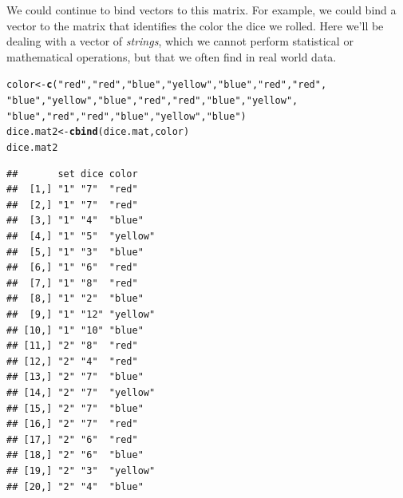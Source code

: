 \documentclass[12pt]{article}\usepackage[]{graphicx}\usepackage[]{color}
\makeatletter
\newcommand{\hlstr}[1]{\textcolor[rgb]{0.192,0.494,0.8}{#1}}%
\newcommand{\hlstd}[1]{\textcolor[rgb]{0.345,0.345,0.345}{#1}}%
\newcommand{\hlkwb}[1]{\textcolor[rgb]{0.69,0.353,0.396}{#1}}%
\newcommand{\hlkwd}[1]{\textcolor[rgb]{0.737,0.353,0.396}{\textbf{#1}}}%
\newenvironment{kframe}{%
 \def\at@end@of@kframe{}%
 \ifinner\ifhmode%
  \def\at@end@of@kframe{\end{minipage}}%
  \begin{minipage}{\columnwidth}%
 \fi\fi%
 \def\FrameCommand##1{\hskip\@totalleftmargin \hskip-\fboxsep
 \colorbox{shadecolor}{##1}\hskip-\fboxsep
     \hskip-\linewidth \hskip-\@totalleftmargin \hskip\columnwidth}%
 \MakeFramed {\advance\hsize-\width
   \@totalleftmargin\z@ \linewidth\hsize
   \@setminipage}}%
 {\par\unskip\endMakeFramed%
 \at@end@of@kframe}
\newenvironment{knitrout}{}{} %
\makeatother
\begin{document}
We could continue to bind vectors to this matrix. For example, we could bind a vector to the matrix that identifies the color the dice we rolled. Here we'll be dealing with a vector of \emph{strings}, which we cannot perform statistical or mathematical operations, but that we often find in real world data.
\begin{knitrout}
\color{fgcolor}\begin{kframe}
\begin{alltt}
\hlstd{color} \hlkwb{<-} \hlkwd{c}\hlstd{(}\hlstr{"red"}\hlstd{,}\hlstr{"red"}\hlstd{,}\hlstr{"blue"}\hlstd{,}\hlstr{"yellow"}\hlstd{,}\hlstr{"blue"}\hlstd{,}\hlstr{"red"}\hlstd{,}\hlstr{"red"}\hlstd{,}
        \hlstr{"blue"}\hlstd{,}\hlstr{"yellow"}\hlstd{,}\hlstr{"blue"}\hlstd{,}\hlstr{"red"}\hlstd{,}\hlstr{"red"}\hlstd{,}\hlstr{"blue"}\hlstd{,}\hlstr{"yellow"}\hlstd{,}
        \hlstr{"blue"}\hlstd{,}\hlstr{"red"}\hlstd{,}\hlstr{"red"}\hlstd{,}\hlstr{"blue"}\hlstd{,}\hlstr{"yellow"}\hlstd{,}\hlstr{"blue"}\hlstd{)}
\hlstd{dice.mat2} \hlkwb{<-} \hlkwd{cbind}\hlstd{(dice.mat,color)}
\hlstd{dice.mat2}
\end{alltt}
\begin{verbatim}
##       set dice color   
##  [1,] "1" "7"  "red"   
##  [2,] "1" "7"  "red"   
##  [3,] "1" "4"  "blue"  
##  [4,] "1" "5"  "yellow"
##  [5,] "1" "3"  "blue"  
##  [6,] "1" "6"  "red"   
##  [7,] "1" "8"  "red"   
##  [8,] "1" "2"  "blue"  
##  [9,] "1" "12" "yellow"
## [10,] "1" "10" "blue"  
## [11,] "2" "8"  "red"   
## [12,] "2" "4"  "red"   
## [13,] "2" "7"  "blue"  
## [14,] "2" "7"  "yellow"
## [15,] "2" "7"  "blue"  
## [16,] "2" "7"  "red"   
## [17,] "2" "6"  "red"   
## [18,] "2" "6"  "blue"  
## [19,] "2" "3"  "yellow"
## [20,] "2" "4"  "blue"
\end{verbatim}
\end{kframe}
\end{knitrout}
\end{document}
